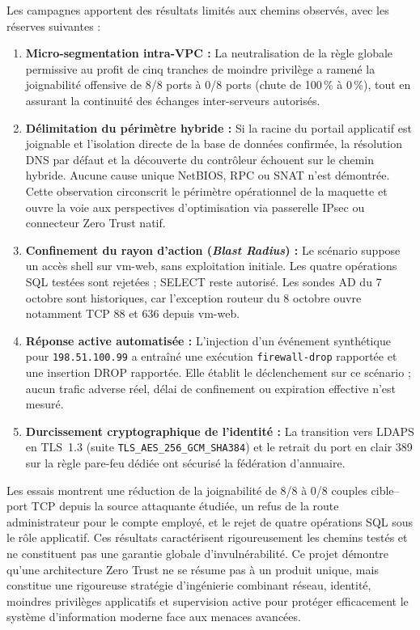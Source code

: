 \documentclass[a4paper,12pt]{report}
\begin{document}
Les campagnes apportent des résultats limités aux chemins observés, avec les réserves suivantes :
\begin{enumerate}
\item \textbf{Micro-segmentation intra-VPC :} La neutralisation de la règle globale permissive au profit de cinq tranches de moindre privilège a ramené la joignabilité offensive de 8/8 ports à 0/8 ports (chute de 100\,\% à 0\,\%), tout en assurant la continuité des échanges inter-serveurs autorisés.
\item \textbf{Délimitation du périmètre hybride :} Si la racine du portail applicatif est joignable et l'isolation directe de la base de données confirmée, la résolution DNS par défaut et la découverte du contrôleur échouent sur le chemin hybride. Aucune cause unique NetBIOS, RPC ou SNAT n'est démontrée. Cette observation circonscrit le périmètre opérationnel de la maquette et ouvre la voie aux perspectives d'optimisation via passerelle IPsec ou connecteur Zero Trust natif.
\item \textbf{Confinement du rayon d'action (\textit{Blast Radius}) :} Le scénario suppose un accès shell sur vm-web, sans exploitation initiale. Les quatre opérations SQL testées sont rejetées ; SELECT reste autorisé. Les sondes AD du 7 octobre sont historiques, car l'exception routeur du 8 octobre ouvre notamment TCP 88 et 636 depuis vm-web.
\item \textbf{Réponse active automatisée :} L'injection d'un événement synthétique pour \texttt{198.51.100.99} a entraîné une exécution \texttt{firewall-drop} rapportée et une insertion DROP rapportée. Elle établit le déclenchement sur ce scénario ; aucun trafic adverse réel, délai de confinement ou expiration effective n'est mesuré.
\item \textbf{Durcissement cryptographique de l'identité :} La transition vers LDAPS en TLS~1.3 (suite \texttt{TLS\_AES\_256\_GCM\_SHA384}) et le retrait du port en clair 389 sur la règle pare-feu dédiée ont sécurisé la fédération d'annuaire.
\end{enumerate}

Les essais montrent une réduction de la joignabilité de 8/8 à 0/8 couples cible--port TCP depuis la source attaquante étudiée, un refus de la route administrateur pour le compte employé, et le rejet de quatre opérations SQL sous le rôle applicatif. Ces résultats caractérisent rigoureusement les chemins testés et ne constituent pas une garantie globale d'invulnérabilité. Ce projet démontre qu'une architecture Zero Trust ne se résume pas à un produit unique, mais constitue une rigoureuse stratégie d'ingénierie combinant réseau, identité, moindres privilèges applicatifs et supervision active pour protéger efficacement le système d'information moderne face aux menaces avancées.
\end{document}
